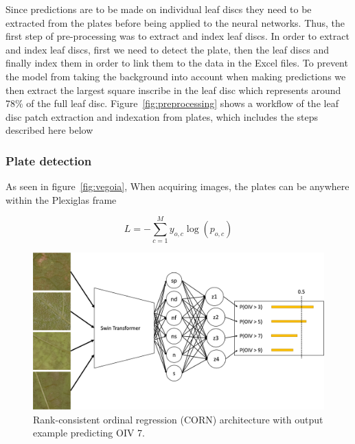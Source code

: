 \documentclass[english]{article}
\begin{document}
Since predictions are to be made on individual leaf discs they need to be extracted from the plates before being applied to the neural networks. Thus, the first step of pre-processing was to extract and index leaf discs. In order to extract and index leaf discs, first we need to detect the plate, then the leaf discs and finally index them in order to link them to the data in the Excel files. To prevent the model from taking the background into account when making predictions we then extract the largest square inscribe in the leaf disc which represents around 78\% of the full leaf disc. Figure~\ref{fig:preprocessing} shows a workflow of the leaf disc patch extraction and indexation from plates, which includes the steps described here below

\subsubsection{Plate detection}
As seen in figure~\ref{fig:vegoia}, When acquiring images, the plates can be anywhere within the Plexiglas frame










\begin{equation}
    L = -\sum_{c=1}^My_{o,c}\log(p_{o,c})\label{fml:crossentropy}
\end{equation}

\begin{figure}[H]
    \centering
    \includegraphics[width=0.9\linewidth]{p_viticola/resources/images/2023_a_oiv_bin_corn.png}
    \caption{Rank-consistent ordinal regression (CORN) architecture with output example predicting OIV 7.}
    \label{fig:corn}
\end{figure}
\end{document}
